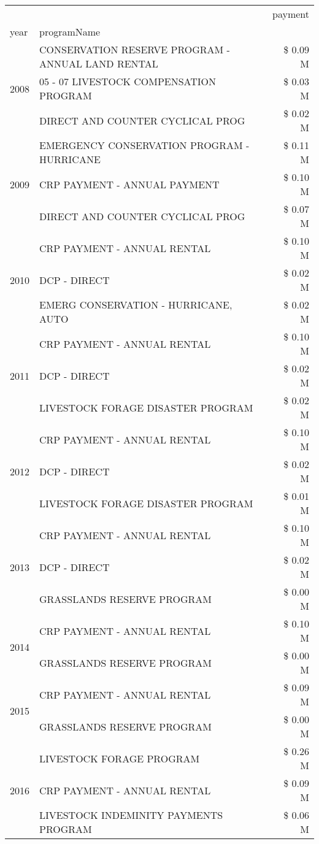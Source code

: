 \begin{tabular}{llr}
\toprule
 &  & payment \\
year & programName &  \\
\midrule
\multirow[t]{3}{*}{2008} & CONSERVATION RESERVE PROGRAM - ANNUAL LAND RENTAL & \$ 0.09 M \\
 & 05 - 07 LIVESTOCK COMPENSATION PROGRAM & \$ 0.03 M \\
 & DIRECT AND COUNTER CYCLICAL PROG & \$ 0.02 M \\
\cline{1-3}
\multirow[t]{3}{*}{2009} & EMERGENCY CONSERVATION PROGRAM - HURRICANE & \$ 0.11 M \\
 & CRP PAYMENT - ANNUAL PAYMENT & \$ 0.10 M \\
 & DIRECT AND COUNTER CYCLICAL PROG & \$ 0.07 M \\
\cline{1-3}
\multirow[t]{3}{*}{2010} & CRP PAYMENT - ANNUAL RENTAL & \$ 0.10 M \\
 & DCP - DIRECT & \$ 0.02 M \\
 & EMERG CONSERVATION - HURRICANE, AUTO & \$ 0.02 M \\
\cline{1-3}
\multirow[t]{3}{*}{2011} & CRP PAYMENT - ANNUAL RENTAL & \$ 0.10 M \\
 & DCP - DIRECT & \$ 0.02 M \\
 & LIVESTOCK FORAGE DISASTER PROGRAM & \$ 0.02 M \\
\cline{1-3}
\multirow[t]{3}{*}{2012} & CRP PAYMENT - ANNUAL RENTAL & \$ 0.10 M \\
 & DCP - DIRECT & \$ 0.02 M \\
 & LIVESTOCK FORAGE DISASTER PROGRAM & \$ 0.01 M \\
\cline{1-3}
\multirow[t]{3}{*}{2013} & CRP PAYMENT - ANNUAL RENTAL & \$ 0.10 M \\
 & DCP - DIRECT & \$ 0.02 M \\
 & GRASSLANDS RESERVE PROGRAM & \$ 0.00 M \\
\cline{1-3}
\multirow[t]{2}{*}{2014} & CRP PAYMENT - ANNUAL RENTAL & \$ 0.10 M \\
 & GRASSLANDS RESERVE PROGRAM & \$ 0.00 M \\
\cline{1-3}
\multirow[t]{2}{*}{2015} & CRP PAYMENT - ANNUAL RENTAL & \$ 0.09 M \\
 & GRASSLANDS RESERVE PROGRAM & \$ 0.00 M \\
\cline{1-3}
\multirow[t]{3}{*}{2016} & LIVESTOCK FORAGE PROGRAM & \$ 0.26 M \\
 & CRP PAYMENT - ANNUAL RENTAL & \$ 0.09 M \\
 & LIVESTOCK INDEMINITY PAYMENTS PROGRAM & \$ 0.06 M \\

\end{tabular}

